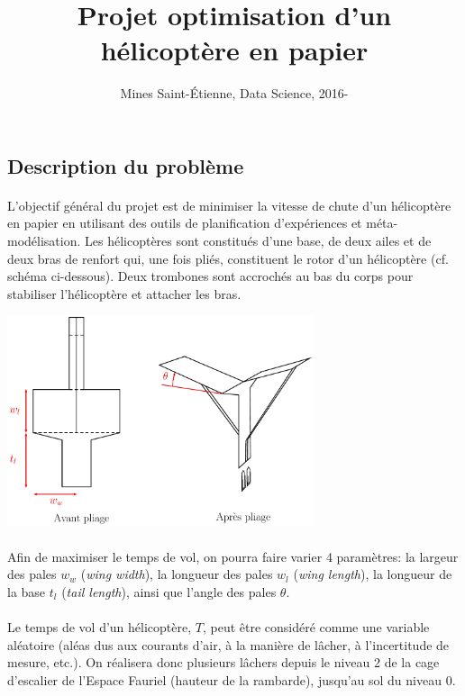 \documentclass[a4paper,10pt]{article}
\title{\vspace{-2cm}Projet optimisation d'un hélicoptère en papier}
\author{Mines Saint-\'Etienne, Data Science,  2016\:-\:2017 }
\date{}
\begin{document}
\maketitle

\subsection*{Description du problème}

\paragraph{}
L'objectif général du projet est de minimiser la vitesse de chute d'un hélicoptère en papier en utilisant des outils de planification d'expériences et méta-modélisation. Les hélicoptères sont constitués d'une base, de deux ailes et de deux bras de renfort qui, une fois pliés, constituent le rotor d'un hélicoptère (cf. schéma ci-dessous). Deux trombones sont accrochés au bas du corps pour stabiliser l'hélicoptère et attacher les bras.

\begin{center}
	\includegraphics[width=9cm]{figures/newhelico.pdf}
\end{center}

\paragraph{}
Afin de maximiser le temps de vol, on pourra faire varier 4 paramètres: la largeur des pales $w_w$ (\emph{wing width}), la longueur des pales $w_l$ (\emph{wing length}), la longueur de la base $t_l$ (\emph{tail length}), ainsi que l'angle des pales $\theta$. 

\paragraph{}
Le temps de vol d'un hélicoptère, $T$,  peut être considéré comme une variable aléatoire (aléas dus aux courants d'air, à la manière de lâcher, à l'incertitude de mesure, etc.). On réalisera donc plusieurs lâchers depuis le niveau 2 de la cage d'escalier de l'Espace Fauriel (hauteur de la rambarde), jusqu'au sol du niveau 0. 
\end{document}
